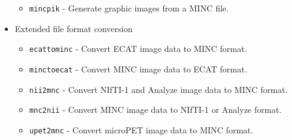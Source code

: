 \documentclass{article}
\begin{document}
\begin{itemize}
\begin{itemize}
\item {\tt mincpik} - Generate graphic images from a MINC file.
\end{itemize}
\item Extended file format conversion
\begin{itemize}
\item {\tt ecattominc} - Convert ECAT image data to MINC format.
\item {\tt minctoecat} - Convert MINC image data to ECAT format.
\item {\tt nii2mnc} - Convert NIfTI-1 and Analyze image data to MINC format.
\item {\tt mnc2nii} - Convert MINC image data to NIfTI-1 or Analyze format.
\item {\tt upet2mnc} - Convert microPET image data to MINC format.
\end{itemize}
\end{itemize}
\end{document}
